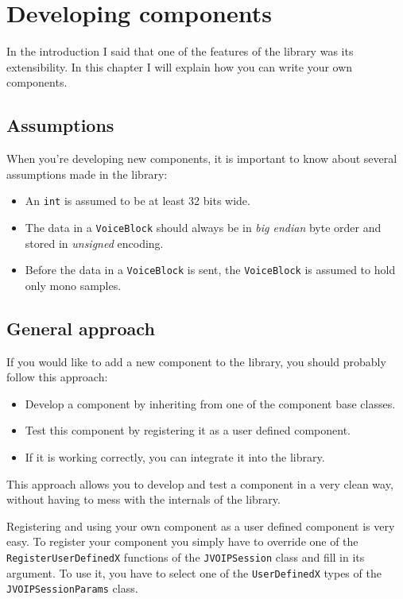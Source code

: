 \chapter{Developing components}
In the introduction I said that one of the features of the library was its
extensibility. In this chapter I will explain how you can write your own
components.

	\section{Assumptions}
	When you're developing new components, it is important to know about several
	assumptions made in the library:
	\begin{itemize}
	\item An {\tt int} is assumed to be at least 32 bits wide.
	\item The data in a {\tt VoiceBlock} should always be in {\em big endian} byte order
	      and stored in {\em unsigned} encoding.
	\item Before the data in a {\tt VoiceBlock} is sent, the {\tt Voice\-Block} is 
	      assumed to hold only mono samples. 
	\end{itemize}
	
	\section{General approach}
	If you would like to add a new component to the library, you should probably
	follow this approach:
	\begin{itemize}
		\item Develop a component by inheriting from one of the component
		      base classes.
		\item Test this component by registering it as a user defined
		      component.
		\item If it is working correctly, you can integrate it into the
		      library.
	\end{itemize}
	
	This approach allows you to develop and test a component in a very clean way,
	without having to mess with the internals of the library.
	
	Registering and using your own component as a user defined component is very
	easy. To register your component you simply have to override one of the
	{\tt RegisterUserDefinedX} functions of the {\tt JVOIPSession} class and fill
	in its argument. To use it, you have to select one of the {\tt UserDefinedX}
	types of the {\tt JVOIPSessionParams} class.
	
